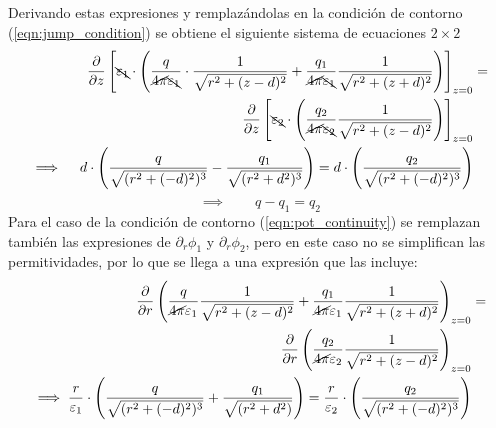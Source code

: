 \documentclass[12pt, oneside, numbers, spanish]{ezthesis}
\numberwithin{equation}{section}
\begin{document}
Derivando estas expresiones y remplazándolas en la condición de contorno (\ref{eqn:jump_condition}) se obtiene el siguiente sistema de ecuaciones $2\times 2$\\
\begin{align*}
\frac{\partial}{\partial z}\left[\bcancel{\varepsilon_1}\cdot\left(\frac{q}{\cancel{4\pi}\bcancel{\varepsilon_1}}\cdot\frac{1}{\sqrt{r^2+(z-d)^2}}+\frac{q_1}{\cancel{4\pi}\bcancel{\varepsilon_1}}\frac{1}{\sqrt{r^2 + (z+d)^2}}\right)\right]_{z = 0} &=\\ \frac{\partial}{\partial z}\left[\bcancel{\varepsilon_2}\cdot\left(\frac{q_2}{\cancel{4\pi}\bcancel{\varepsilon_2}}\frac{1}{\sqrt{r^2 + (z-d)^2}}\right)\right]_{z=0}&\\
\implies\quad d\cdot\left(\frac{q}{\sqrt{(r^2 + (-d)^2)^3}} - \frac{q_1}{\sqrt{(r^2 + d^2)^3}}\right) = d\cdot\left(\frac{q_2}{\sqrt{(r^2 + (-d)^2)^3}}\right)
\end{align*}
\begin{equation}\label{eqn:image_system_eq1}
\implies \qquad q - q_1 = q_2
\end{equation}
Para el caso de la condición de contorno (\ref{eqn:pot_continuity}) se remplazan también las expresiones de $\partial_r\phi_1$ y $\partial_r\phi_2$, pero en este caso no se simplifican las permitividades, por lo que se llega a una expresión que las incluye:
\begin{align*}
\frac{\partial}{\partial r}\left(\frac{q}{\cancel{4\pi}\varepsilon_1}\frac{1}{\sqrt{r^2 + (z-d)^2}} + \frac{q_1}{\cancel{4\pi}\varepsilon_1}\frac{1}{\sqrt{r^2 + (z+d)^2}}\right)_{z=0}& =\\
\frac{\partial}{\partial r}\left(\frac{q_2}{\cancel{4\pi}\varepsilon_2}\frac{1}{\sqrt{r^2 + (z-d)^2}}\right)_{z=0}&\\
\implies \frac{r}{\varepsilon_1}\cdot\left(\frac{q}{\sqrt{(r^2 + (-d)^2)^3}}+ \frac{q_1}{\sqrt{(r^2 + d^2)}}\right) = \frac{r}{\varepsilon_2}\cdot\left(\frac{q_2}{\sqrt{(r^2 + (-d)^2)^3}}\right)&
\end{align*}
\end{document}
